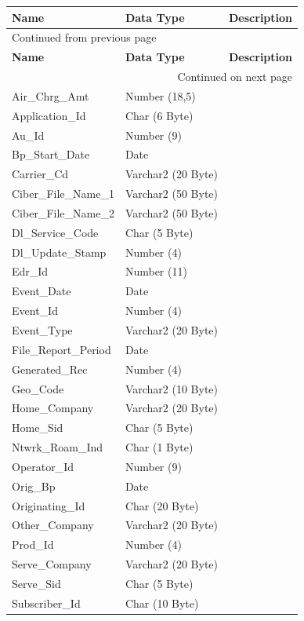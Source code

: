 \documentclass[12pt,twoside]{article}
\begin{document}
\begin{longtable}{l|l|l}
\hline
\textbf{Name} & \textbf{Data Type} & \textbf{Description}\\
\hline
\endfirsthead
\multicolumn{3}{l}{Continued from previous page} \\
\hline

\textbf{Name} & \textbf{Data Type} & \textbf{Description} \\

\hline
\endhead
\hline\multicolumn{3}{r}{Continued on next page} \\
\endfoot
\endlastfoot
\hline
Air\_Chrg\_Amt & Number (18,5) & \\
Application\_Id & Char (6 Byte) & \\
Au\_Id & Number (9) & \\
Bp\_Start\_Date & Date & \\
Carrier\_Cd & Varchar2 (20 Byte) & \\
Ciber\_File\_Name\_1 & Varchar2 (50 Byte) & \\
Ciber\_File\_Name\_2 & Varchar2 (50 Byte) & \\
Dl\_Service\_Code & Char (5 Byte) & \\
Dl\_Update\_Stamp & Number (4) & \\
Edr\_Id & Number (11) & \\
Event\_Date & Date & \\
Event\_Id & Number (4) & \\
Event\_Type & Varchar2 (20 Byte) & \\
File\_Report\_Period & Date & \\
Generated\_Rec & Number (4) & \\
Geo\_Code & Varchar2 (10 Byte) & \\
Home\_Company & Varchar2 (20 Byte) & \\
Home\_Sid & Char (5 Byte) & \\
Ntwrk\_Roam\_Ind & Char (1 Byte) & \\
Operator\_Id & Number (9) & \\
Orig\_Bp & Date & \\
Originating\_Id & Char (20 Byte) & \\
Other\_Company & Varchar2 (20 Byte) & \\
Prod\_Id & Number (4) & \\
Serve\_Company & Varchar2 (20 Byte) & \\
Serve\_Sid & Char (5 Byte) & \\
Subscriber\_Id & Char (10 Byte) & \\

\end{longtable}
\end{document}

